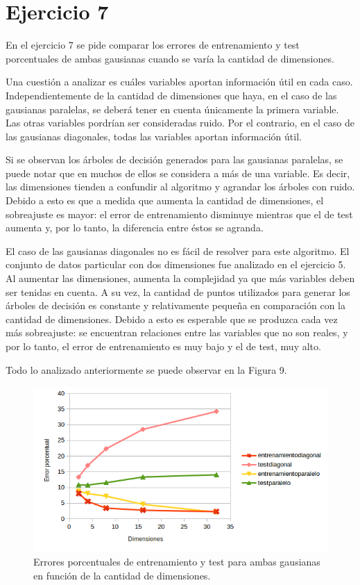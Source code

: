 \documentclass[12pt, a4paper]{article}
\begin{document}
\section*{Ejercicio 7}
En el ejercicio 7 se pide comparar los errores de entrenamiento y test porcentuales de ambas gausianas cuando se varía la cantidad de dimensiones. 


\bigskip

Una cuestión a analizar es cuáles variables aportan información útil en cada caso. Independientemente de la cantidad de dimensiones que haya, en el caso de las gausianas paralelas, se deberá tener en cuenta únicamente la primera variable. Las otras variables pordrían ser consideradas ruido. Por el contrario, en el caso de las gausianas diagonales, todas las variables aportan información útil.  

\bigskip

Si se observan los árboles de decisión generados para las gausianas paralelas, se puede notar que en muchos de ellos se considera a más de una variable. Es decir, las dimensiones tienden a confundir al algoritmo y agrandar los árboles con ruido. Debido a esto es que a medida que aumenta la cantidad de dimensiones, el sobreajuste es mayor: el error de entrenamiento disminuye mientras que el de test aumenta y, por lo tanto, la diferencia entre éstos se agranda.

\bigskip

El caso de las gausianas diagonales no es fácil de resolver para este algoritmo. El conjunto de datos particular con dos dimensiones fue analizado en el ejercicio 5. Al aumentar las dimensiones, aumenta la complejidad ya que más variables deben ser tenidas en cuenta. A su vez, la cantidad de puntos utilizados para generar los árboles de decisión es constante y relativamente pequeña en comparación con la cantidad de dimensiones. Debido a esto es esperable que se produzca cada vez más sobreajuste: se encuentran relaciones entre las variables que no son reales, y por lo tanto, el error de entrenamiento es muy bajo y el de test, muy alto.

\bigskip

Todo lo analizado anteriormente se puede observar en la Figura 9.

\begin{figure}
    \centering
	\includegraphics[scale=0.70]{ejercicio7}
	\caption{Errores porcentuales de entrenamiento y test para ambas gausianas en función de la cantidad de dimensiones.}
\end{figure}
\end{document}
